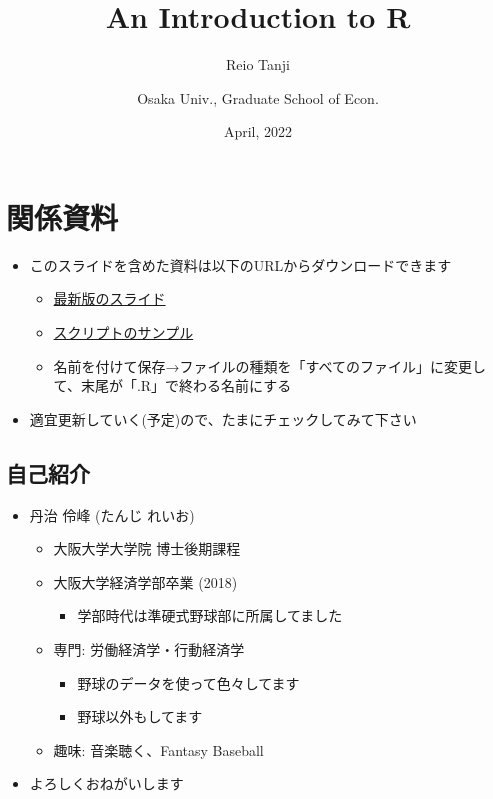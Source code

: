 \documentclass[
]{ltjsarticle}
\title{An Introduction to R}
\author{Reio Tanji \and Osaka Univ., Graduate School of Econ.}
\date{April, 2022}
\providecommand{\tightlist}{%
  \setlength{\itemsep}{0pt}\setlength{\parskip}{0pt}}
\begin{document}
\maketitle

\hypertarget{ux95a2ux4fc2ux8cc7ux6599}{%
\section{関係資料}\label{ux95a2ux4fc2ux8cc7ux6599}}

\begin{itemize}
\tightlist
\item
  このスライドを含めた資料は以下のURLからダウンロードできます

  \begin{itemize}
  \tightlist
  \item
    \href{https://github.com/T-Reio/r_introduction/blob/main/introduction1.pdf}{最新版のスライド}
  \item
    \href{https://raw.githubusercontent.com/T-Reio/r_introduction/main/script/script_sample.R}{スクリプトのサンプル}
  \item
    名前を付けて保存→ファイルの種類を「すべてのファイル」に変更して、末尾が「.R」で終わる名前にする
  \end{itemize}
\item
  適宜更新していく(予定)ので、たまにチェックしてみて下さい
\end{itemize}

\hypertarget{ux81eaux5df1ux7d39ux4ecb}{%
\subsection{自己紹介}\label{ux81eaux5df1ux7d39ux4ecb}}

\begin{itemize}
\tightlist
\item
  丹治 伶峰 (たんじ れいお)

  \begin{itemize}
  \tightlist
  \item
    大阪大学大学院 博士後期課程
  \item
    大阪大学経済学部卒業 (2018)

    \begin{itemize}
    \tightlist
    \item
      学部時代は準硬式野球部に所属してました
    \end{itemize}
  \item
    専門: 労働経済学・行動経済学

    \begin{itemize}
    \tightlist
    \item
      野球のデータを使って色々してます
    \item
      野球以外もしてます
    \end{itemize}
  \item
    趣味: 音楽聴く、Fantasy Baseball
  \end{itemize}
\item
  よろしくおねがいします
\end{itemize}
\end{document}
